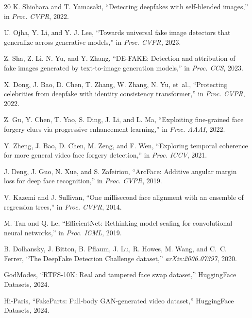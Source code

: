 \documentclass[11pt, twocolumn]{article}
\begin{document}
\begin{thebibliography}{20}
K. Shiohara and T. Yamasaki, ``Detecting deepfakes with self-blended images,'' in \textit{Proc. CVPR}, 2022.

U. Ojha, Y. Li, and Y. J. Lee, ``Towards universal fake image detectors that generalize across generative models,'' in \textit{Proc. CVPR}, 2023.

Z. Sha, Z. Li, N. Yu, and Y. Zhang, ``DE-FAKE: Detection and attribution of fake images generated by text-to-image generation models,'' in \textit{Proc. CCS}, 2023.

X. Dong, J. Bao, D. Chen, T. Zhang, W. Zhang, N. Yu, et~al., ``Protecting celebrities from deepfake with identity consistency transformer,'' in \textit{Proc. CVPR}, 2022.

Z. Gu, Y. Chen, T. Yao, S. Ding, J. Li, and L. Ma, ``Exploiting fine-grained face forgery clues via progressive enhancement learning,'' in \textit{Proc. AAAI}, 2022.

Y. Zheng, J. Bao, D. Chen, M. Zeng, and F. Wen, ``Exploring temporal coherence for more general video face forgery detection,'' in \textit{Proc. ICCV}, 2021.

J. Deng, J. Guo, N. Xue, and S. Zafeiriou, ``ArcFace: Additive angular margin loss for deep face recognition,'' in \textit{Proc. CVPR}, 2019.

V. Kazemi and J. Sullivan, ``One millisecond face alignment with an ensemble of regression trees,'' in \textit{Proc. CVPR}, 2014.

M. Tan and Q. Le, ``EfficientNet: Rethinking model scaling for convolutional neural networks,'' in \textit{Proc. ICML}, 2019.

B. Dolhansky, J. Bitton, B. Pflaum, J. Lu, R. Howes, M. Wang, and C.~C. Ferrer, ``The DeepFake Detection Challenge dataset,'' \textit{arXiv:2006.07397}, 2020.

GodModes, ``RTFS-10K: Real and tampered face swap dataset,'' HuggingFace Datasets, 2024.

Hi-Paris, ``FakeParts: Full-body GAN-generated video dataset,'' HuggingFace Datasets, 2024.

\end{thebibliography}
\end{document}
